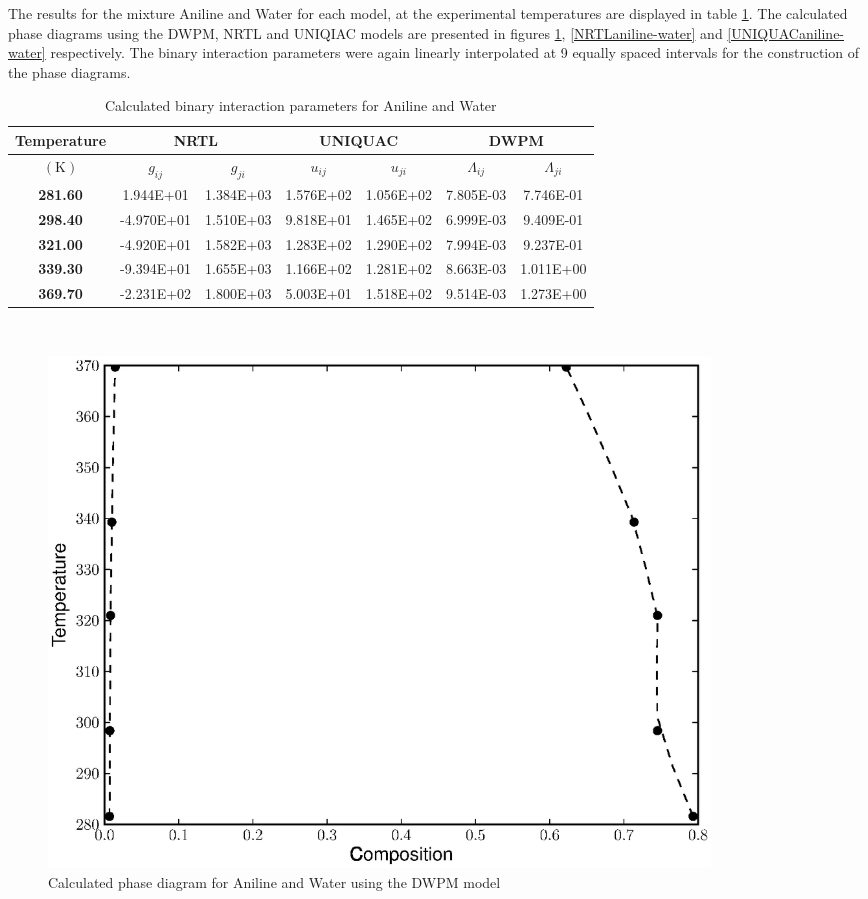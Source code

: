 The results for the mixture Aniline and Water for each model, at the experimental temperatures are displayed in table \ref{AnilineWaterTable}. The calculated phase diagrams using the DWPM, NRTL and UNIQIAC models are presented in figures \ref{DWPManiline-water}, \ref{NRTLaniline-water} and \ref{UNIQUACaniline-water} respectively. The binary interaction parameters were again linearly interpolated at 9 equally spaced intervals for the construction of the phase diagrams. 

\begin{table}
\begin{tabularx}{\textwidth}{c|cc|cc|cc}
\hline
\textbf{Temperature}&\multicolumn{2}{c|}{\textbf{NRTL}}&\multicolumn{2}{c|}{\textbf{UNIQUAC}}&\multicolumn{2}{c}{\textbf{DWPM}}\\
\hline
\hline 
$\left(\mathrm{K}\right)$&$g_{ij}$&$g_{ji}$&$u_{ij}$&$u_{ji}$&$\Lambda_{ij}$&$\Lambda_{ji}$\\
\hline
\textbf{ 281.60 } & 1.944E+01 & 1.384E+03 & 1.576E+02 & 1.056E+02 & 7.805E-03 & 7.746E-01\\
\textbf{ 298.40 } & -4.970E+01 & 1.510E+03 & 9.818E+01 & 1.465E+02 & 6.999E-03 & 9.409E-01\\
\textbf{ 321.00 } & -4.920E+01 & 1.582E+03 & 1.283E+02 & 1.290E+02 & 7.994E-03 & 9.237E-01\\
\textbf{ 339.30 } & -9.394E+01 & 1.655E+03 & 1.166E+02 & 1.281E+02 & 8.663E-03 & 1.011E+00\\
\textbf{ 369.70 } & -2.231E+02 & 1.800E+03 & 5.003E+01 & 1.518E+02 & 9.514E-03 & 1.273E+00\\
\hline
\end{tabularx}\\
\caption{Calculated binary interaction parameters for Aniline and Water} \label{AnilineWaterTable}
\end{table}

\begin{figure}[hp]
\centering
\includegraphics[width = 0.85\textwidth]{Results_Parts/BinaryParams/aniline-water/DWPM/PhaseDiagram.eps}
\caption{Calculated phase diagram for Aniline and Water using the DWPM model} \label{DWPManiline-water}
\end{figure}


